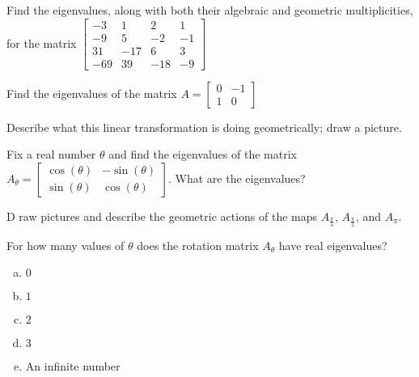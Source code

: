 \begin{applicationActivities}{4}{28}
\begin{activity}{0}
   Find the eigenvalues, along with both their algebraic and geometric multiplicities, for the matrix $\begin{bmatrix} -3 & 1 & 2 & 1 \\ -9 & 5 & -2 & -1 \\ 31 & -17 & 6 & 3 \\ -69 & 39 & -18 & -9 \end{bmatrix}$
\end{activity}

\begin{activity}{0}
  Find the eigenvalues of the matrix $A=\begin{bmatrix}0 & -1 \\ 1 & 0 \end{bmatrix}$
\end{activity}

\begin{activity}{0}
   Describe what this linear transformation is doing geometrically; draw a picture.
\end{activity}

\begin{activity}{0}
   Fix a real number $\theta$ and find the eigenvalues of the matrix $A_{\theta} = \begin{bmatrix} \cos(\theta) & -\sin(\theta) \\ \sin(\theta) & \cos (\theta) \end{bmatrix}$.  What are the eigenvalues?
\end{activity}

\begin{activity}{0} D
  raw pictures and describe the geometric actions of the maps $A_{\frac{\pi}{4
  }}$, $A_{\frac{\pi}{2}}$, and $A_{\pi}$.
\end{activity}

\begin{activity}{0}
  For how many values of $\theta$ does the rotation matrix $A_\theta$ have real eigenvalues?
\begin{enumerate}[(a)]
\item $0$
\item $1$
\item $2$
\item $3$
\item An infinite number
\end{enumerate}
\end{activity}

\end{applicationActivities}

